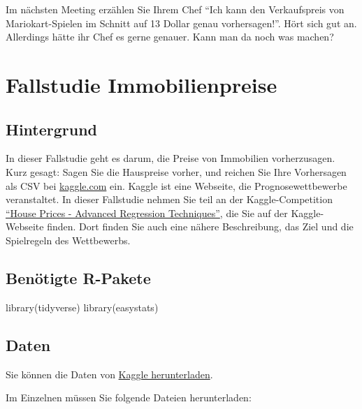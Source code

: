\documentclass[
  letterpaper,
]{scrbook}
\newenvironment{Shaded}{\begin{snugshade}}{\end{snugshade}}
\newcommand{\FunctionTok}[1]{\textcolor[rgb]{0.28,0.35,0.67}{#1}}
\newcommand{\NormalTok}[1]{\textcolor[rgb]{0.00,0.23,0.31}{#1}}
\theoremstyle{definition}
\theoremstyle{definition}
\theoremstyle{definition}
\theoremstyle{remark}
\begin{document}
Im nächsten Meeting erzählen Sie Ihrem Chef \enquote{Ich kann den
Verkaufspreis von Mariokart-Spielen im Schnitt auf 13 Dollar genau
vorhersagen!}. Hört sich gut an. Allerdings hätte ihr Chef es gerne
genauer. Kann man da noch was machen?

\section{Fallstudie Immobilienpreise}\label{fallstudie-immobilienpreise}

\subsection{Hintergrund}\label{hintergrund}

In dieser Fallstudie geht es darum, die Preise von Immobilien
vorherzusagen. Kurz gesagt: Sagen Sie die Hauspreise vorher, und reichen
Sie Ihre Vorhersagen als CSV bei
\href{https://www.kaggle.com/}{kaggle.com} ein. Kaggle ist eine
Webseite, die Prognosewettbewerbe veranstaltet. In dieser Fallstudie
nehmen Sie teil an der Kaggle-Competition
\href{https://www.kaggle.com/competitions/house-prices-advanced-regression-techniques/overview}{\enquote{House
Prices - Advanced Regression Techniques}}, die Sie auf der
Kaggle-Webseite finden. Dort finden Sie auch eine nähere Beschreibung,
das Ziel und die Spielregeln des Wettbewerbs.

\subsection{Benötigte R-Pakete}\label{benuxf6tigte-r-pakete-6}

\begin{Shaded}
\begin{Highlighting}[]
\FunctionTok{library}\NormalTok{(tidyverse)}
\FunctionTok{library}\NormalTok{(easystats)}
\end{Highlighting}
\end{Shaded}

\subsection{Daten}\label{daten-1}

Sie können die Daten von
\href{https://www.kaggle.com/competitions/house-prices-advanced-regression-techniques/data}{Kaggle
herunterladen}.

Im Einzelnen müssen Sie folgende Dateien herunterladen:
\end{document}
